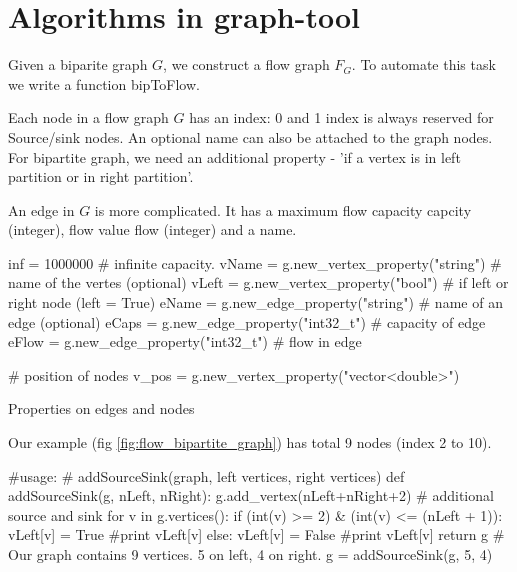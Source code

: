 \documentclass[10pt,a4paper]{article}%
\begin{document}
\nwenddocs{}\section{Algorithms in {\Tt{}graph-tool\nwendquote}}

Given a biparite graph $G$, we construct a flow graph $F_G$. To automate this
task we write a function {\Tt{}bipToFlow\nwendquote}.

Each node in a flow graph $G$ has an index: 0 and 1 index is always reserved for
Source/sink nodes.  An optional {\Tt{}name\nwendquote} can also be attached to the graph
nodes. For bipartite graph, we need an additional property - 'if a vertex is in
left partition or in right partition'.

An edge in $G$ is more complicated. It has a maximum flow capacity {\Tt{}capcity\nwendquote} (integer),
flow value {\Tt{}flow\nwendquote} (integer) and a {\Tt{}name\nwendquote}.

\nwenddocs{}\endmoddef\nwstartdeflinemarkup\nwenddeflinemarkup
inf = 1000000 # infinite capacity.
vName = g.new_vertex_property("string") # name of the vertes (optional)
vLeft = g.new_vertex_property("bool") # if left or right node (left = True)
eName = g.new_edge_property("string") # name of an edge (optional)
eCaps = g.new_edge_property("int32_t") # capacity of edge
eFlow = g.new_edge_property("int32_t") # flow in edge 
\nwendcode{}\nwdocspar

\nwenddocs{}\plusendmoddef\nwstartdeflinemarkup\nwenddeflinemarkup
# position of nodes
v_pos = g.new_vertex_property("vector<double>")

\nwendcode{}\endmoddef\nwstartdeflinemarkup\nwenddeflinemarkup
\LA{}Properties on edges and nodes\RA{}

\nwendcode{}Our example (fig \ref{fig:flow_bipartite_graph}) has total 9 nodes (index 2 to
10).

\nwenddocs{}\endmoddef\nwstartdeflinemarkup\nwenddeflinemarkup
#usage: 
#   addSourceSink(graph, left vertices, right vertices)
def addSourceSink(g, nLeft, nRight):
    g.add_vertex(nLeft+nRight+2) # additional source and sink
    for v in g.vertices():
        if (int(v) >= 2) & (int(v) <= (nLeft + 1)):
            vLeft[v] = True
            #print vLeft[v]
        else:
            vLeft[v] = False
            #print vLeft[v]
    return g
\eatline
\nwendcode{}\nwdocspar
\nwenddocs{}\plusendmoddef\nwstartdeflinemarkup\nwenddeflinemarkup
# Our graph contains 9 vertices. 5 on left, 4 on right.
g = addSourceSink(g, 5, 4)
\end{document}
